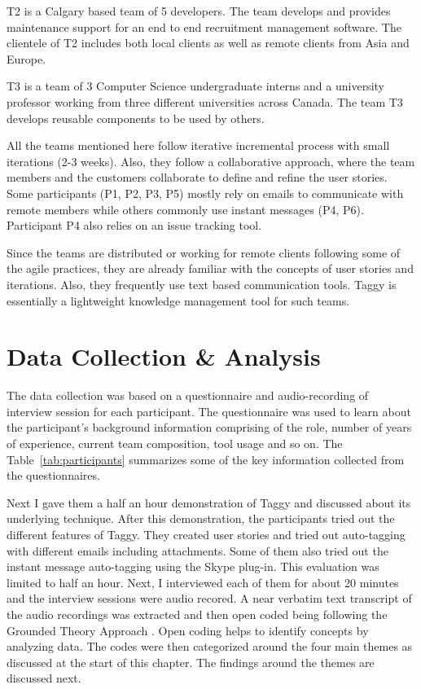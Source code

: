 T2 is a Calgary based team of 5 developers. The team develops and provides maintenance support for an end to end recruitment management software. The clientele of T2 includes both local clients as well as remote clients from Asia and Europe. 

T3 is a team of 3 Computer Science undergraduate interns and a university professor working from three different universities across Canada. The team T3 develops reusable components to be used by others.

All the teams mentioned here follow iterative incremental process with small iterations (2-3 weeks). Also, they follow a collaborative approach, where the team members and the customers collaborate to define and refine the user stories. Some participants (P1, P2, P3, P5) mostly rely on emails to communicate with remote members while others commonly use instant messages (P4, P6). Participant P4 also relies on an issue tracking tool.

Since the teams are distributed or working for remote clients following some of the agile practices, they are already familiar with the concepts of user stories and iterations. Also, they frequently use text based communication tools. Taggy is essentially a lightweight knowledge management tool for such teams.

\section{Data Collection \& Analysis}
The data collection was based on a questionnaire and audio-recording of interview session for each participant. The questionnaire was used to learn about the participant's background information comprising of the role, number of years of experience, current team composition, tool usage and so on. The Table~\ref{tab:participants} summarizes some of the key information collected from the questionnaires.

Next I gave them a half an hour demonstration of Taggy and discussed about its underlying technique. After this demonstration, the participants tried out the different features of Taggy. They created user stories and tried out auto-tagging with different emails including attachments. Some of them also tried out the instant message auto-tagging using the Skype plug-in. This evaluation was limited to half an hour. Next, I interviewed each of them for about 20 minutes and the interview sessions were audio recored. A near verbatim text transcript of the audio recordings was extracted and then open coded being following the Grounded Theory Approach \cite{grounded_theory}. Open coding helps to identify concepts by analyzing data. The codes were then categorized around the four main themes as discussed at the start of this chapter. The findings around the themes are discussed next.

